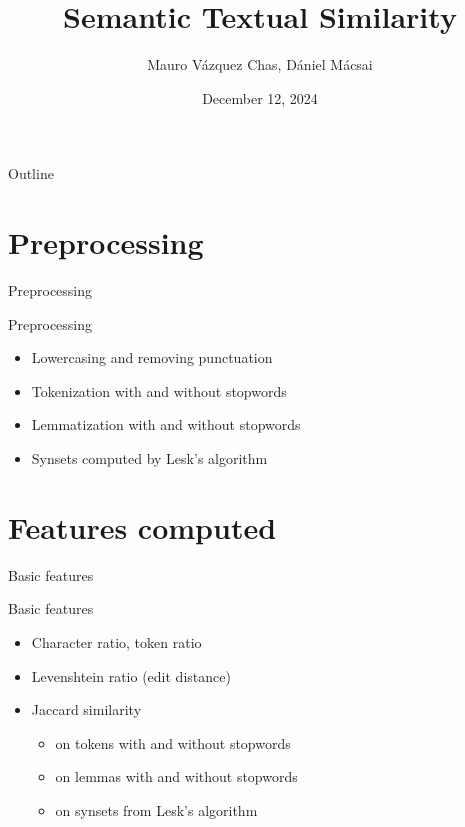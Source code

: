 \documentclass[usenames,dvipsnames]{beamer}
\title[Semantic Textual Similarity]{Semantic Textual Similarity}
\author{Mauro Vázquez Chas, Dániel Mácsai}
\date{December 12, 2024}
\begin{document}
\begin{frame}
    \titlepage
\end{frame}

\begin{frame}{Outline}
    \tableofcontents
\end{frame}

\section{Preprocessing}
\begin{frame}{Preprocessing}
    \begin{block}{Preprocessing}
        \begin{itemize}
            \item Lowercasing and removing punctuation
            \item Tokenization with and without stopwords
            \item Lemmatization with and without stopwords
            \item Synsets computed by Lesk's algorithm
        \end{itemize}
    \end{block}
\end{frame}

\section{Features computed}

\begin{frame}{Basic features}
    \begin{block}{Basic features}
        \begin{itemize}
            \item Character ratio, token ratio
            \item Levenshtein ratio (edit distance)
            \item Jaccard similarity
                \begin{itemize}
                    \item on tokens with and without stopwords 
                    \item on lemmas with and without stopwords
                    \item on synsets from Lesk's algorithm
                \end{itemize}   
        \end{itemize}
    \end{block}
\end{frame}
\end{document}
